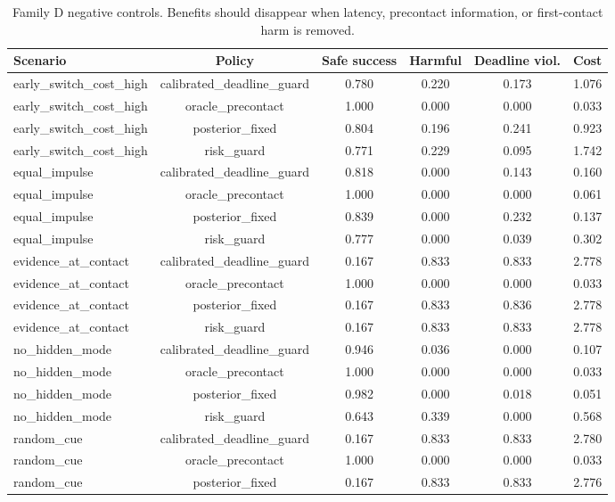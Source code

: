 \begin{table}[t]
\centering
\small
\caption{Family D negative controls. Benefits should disappear when latency, precontact information, or first-contact harm is removed.}
\label{tab:negative-controls}
\begin{tabular}{lccccc}
\toprule
Scenario & Policy & Safe success & Harmful & Deadline viol. & Cost \\
\midrule
early\_switch\_cost\_high & calibrated\_deadline\_guard & 0.780 & 0.220 & 0.173 & 1.076 \\
early\_switch\_cost\_high & oracle\_precontact & 1.000 & 0.000 & 0.000 & 0.033 \\
early\_switch\_cost\_high & posterior\_fixed & 0.804 & 0.196 & 0.241 & 0.923 \\
early\_switch\_cost\_high & risk\_guard & 0.771 & 0.229 & 0.095 & 1.742 \\
equal\_impulse & calibrated\_deadline\_guard & 0.818 & 0.000 & 0.143 & 0.160 \\
equal\_impulse & oracle\_precontact & 1.000 & 0.000 & 0.000 & 0.061 \\
equal\_impulse & posterior\_fixed & 0.839 & 0.000 & 0.232 & 0.137 \\
equal\_impulse & risk\_guard & 0.777 & 0.000 & 0.039 & 0.302 \\
evidence\_at\_contact & calibrated\_deadline\_guard & 0.167 & 0.833 & 0.833 & 2.778 \\
evidence\_at\_contact & oracle\_precontact & 1.000 & 0.000 & 0.000 & 0.033 \\
evidence\_at\_contact & posterior\_fixed & 0.167 & 0.833 & 0.836 & 2.778 \\
evidence\_at\_contact & risk\_guard & 0.167 & 0.833 & 0.833 & 2.778 \\
no\_hidden\_mode & calibrated\_deadline\_guard & 0.946 & 0.036 & 0.000 & 0.107 \\
no\_hidden\_mode & oracle\_precontact & 1.000 & 0.000 & 0.000 & 0.033 \\
no\_hidden\_mode & posterior\_fixed & 0.982 & 0.000 & 0.018 & 0.051 \\
no\_hidden\_mode & risk\_guard & 0.643 & 0.339 & 0.000 & 0.568 \\
random\_cue & calibrated\_deadline\_guard & 0.167 & 0.833 & 0.833 & 2.780 \\
random\_cue & oracle\_precontact & 1.000 & 0.000 & 0.000 & 0.033 \\
random\_cue & posterior\_fixed & 0.167 & 0.833 & 0.833 & 2.776 \\

\end{tabular}
\end{table}
